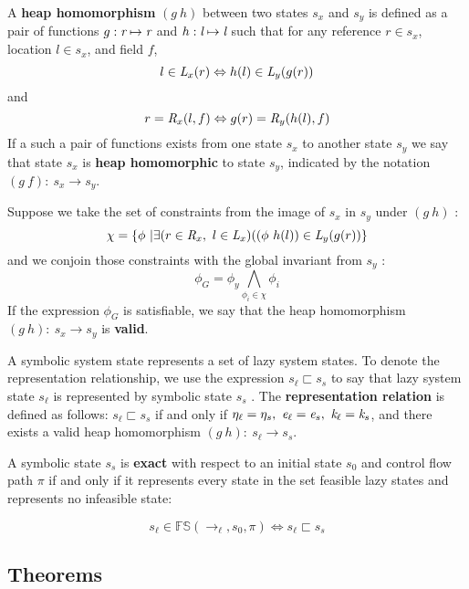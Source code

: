 \begin{definition}
A \textbf{heap homomorphism} $(g\ h)$ between two states $s_x$ and $s_y$ is defined as a pair of functions $g:\emph{r} \mapsto \emph{r}$ and $h:\emph{l} \mapsto \emph{l}$ such that for any reference $r \in s_x$, location $l \in s_x$, and field $f$, $$ l \in \emph{L}_x(r) \Leftrightarrow h(l)\in \emph{L}_y(g(r))$$ and $$ r = \emph{R}_x(l,f) \Leftrightarrow g(r) = \emph{R}_y(h(l),f)$$ If a such a pair of functions exists from one state $s_x$ to another state $s_y$ we say that state $s_x$ is \textbf{heap homomorphic} to state $s_y$, indicated by the notation $(g\ f):\ s_x \rightarrow s_y$. 

Suppose we take the set of constraints from the image of $s_x$ in $s_y$ under $(g\ h)$ :
$$\chi = \{ \phi\ | \exists (r \in \emph{R}_x,\  l \in \emph{L}_x) ( (\phi\ h(l)) \in \emph{L}_y (g(r))  \}$$ and we conjoin those constraints with the global invariant from $s_y$ :
$$\phi_G = \phi_y \bigwedge_{\phi_i \in \chi} \phi_i $$
 If the expression $\phi_G$ is satisfiable, we say that the heap homomorphism $(g\ h):\ s_x \rightarrow s_y $ is \textbf{valid}.
\end{definition}
\begin{definition}
A symbolic system state represents a set of lazy system states. To denote the representation relationship, we use the expression $s_\ell \sqsubset s_s $ to say that lazy system state $s_\ell$ is represented by symbolic state $s_s$ . The \textbf{representation relation} is defined as follows: $s_\ell \sqsubset s_s $ if and only if $\eta_{\ell} = \eta_{s} ,\ \cfgnt{e}_{\ell} = \cfgnt{e}_{s} ,\ \cfgnt{k}_{\ell} = \cfgnt{k}_{s}$, and there exists a valid heap homomorphism $(g\ h):\ s_\ell \rightarrow s_s $.
\end{definition}

\begin{definition}
A symbolic state $s_s$ is \textbf{exact} with respect to an initial state $s_0$ and control flow path $\pi$ if and only if it represents every state in the set feasible lazy states and represents no infeasible state:

$$ s_\ell \in \mathbb{FS}(\rightarrow_{\ell},s_0,\pi) \Leftrightarrow s_\ell \sqsubset s_s $$

\end{definition}

\subsection{Theorems}

